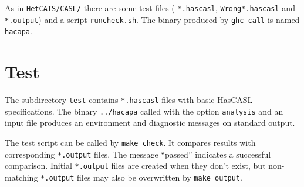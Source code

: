 \documentclass{article}
\begin{document}
As in \texttt{HetCATS/CASL/} there are some test files (
\texttt{*.hascasl}, \texttt{Wrong*.hascasl} and \texttt{*.output}) and a
script \texttt{runcheck.sh}. The binary produced by \texttt{ghc-call}
is named \texttt{hacapa}.

\section{Test}

The subdirectory \texttt{test} contains \texttt{*.hascasl} files with basic
HasCASL specifications. The binary \texttt{../hacapa} called with the option
\texttt{analysis} and an input file produces an environment and diagnostic
messages on standard output. 

The test script can be called by \texttt{make check}. It compares results with
corresponding \texttt{*.output} files. The message ``passed'' indicates a
successful comparison. Initial \texttt{*.output} files are created when they
don't exist, but non-matching \texttt{*.output} files may also be overwritten
by \texttt{make output}.
\end{document}
